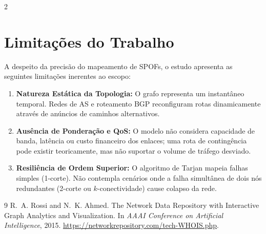 \documentclass[10pt,a4paper]{article}
\begin{document}
\begin{multicols}{2}
\section{Limitações do Trabalho}
A despeito da precisão do mapeamento de SPOFs, o estudo apresenta as seguintes limitações inerentes ao escopo:
\begin{enumerate}
    \setlength{\itemsep}{0pt}
    \item \textbf{Natureza Estática da Topologia:} O grafo representa um instantâneo temporal. Redes de AS e roteamento BGP reconfiguram rotas dinamicamente através de anúncios de caminhos alternativos.
    \item \textbf{Ausência de Ponderação e QoS:} O modelo não considera capacidade de banda, latência ou custo financeiro dos enlaces; uma rota de contingência pode existir teoricamente, mas não suportar o volume de tráfego desviado.
    \item \textbf{Resiliência de Ordem Superior:} O algoritmo de Tarjan mapeia falhas simples (1-corte). Não contempla cenários onde a falha simultânea de dois nós redundantes (2-corte ou $k$-conectividade) cause colapso da rede.
\end{enumerate}

\begin{thebibliography}{9}
R.~A. Rossi and N.~K. Ahmed.
\newblock The Network Data Repository with Interactive Graph Analytics and Visualization.
\newblock In \emph{AAAI Conference on Artificial Intelligence}, 2015.
\url{https://networkrepository.com/tech-WHOIS.php}.
\end{thebibliography}

\end{multicols}
\end{document}
